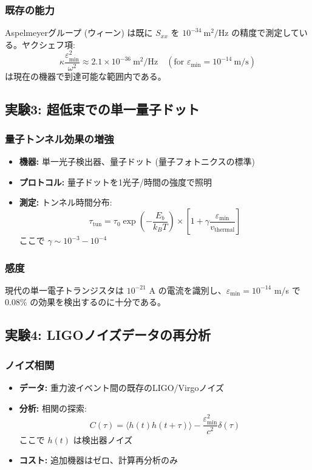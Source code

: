 \documentclass[11pt,a4paper]{article}
\begin{document}
	\subsubsection{既存の能力}
	
	Aspelmeyerグループ (ウィーン) は既に $S_{xx}$ を $10^{-34}\ \text{m}^2/\text{Hz}$ の精度で測定している。ヤクシェフ項:
	\[
	\kappa\frac{\varepsilon_{\min}^2}{\omega^2} \approx 2.1 \times 10^{-36}\ \text{m}^2/\text{Hz} \quad (\text{for } \varepsilon_{\min} = 10^{-14}\ \text{m/s})
	\]
	は現在の機器で到達可能な範囲内である。
	
	\subsection{実験3: 超低束での単一量子ドット}
	
	\subsubsection{量子トンネル効果の増強}
	\begin{itemize}
		\item \textbf{機器:} 単一光子検出器、量子ドット (量子フォトニクスの標準)
		\item \textbf{プロトコル:} 量子ドットを1光子/時間の強度で照明
		\item \textbf{測定:} トンネル時間分布:
		\[
		\tau_{\text{tun}} = \tau_0 \exp\left(-\frac{E_b}{k_B T}\right) \times \left[1 + \gamma\frac{\varepsilon_{\min}}{v_{\text{thermal}}}\right]
		\]
		ここで $\gamma \sim 10^{-3} - 10^{-4}$
	\end{itemize}
	
	\subsubsection{感度}
	
	現代の単一電子トランジスタは $10^{-21}$ A の電流を識別し、$\varepsilon_{\min} = 10^{-14}$ m/s で 0.08\% の効果を検出するのに十分である。
	
	\subsection{実験4: LIGOノイズデータの再分析}
	
	\subsubsection{ノイズ相関}
	\begin{itemize}
		\item \textbf{データ:} 重力波イベント間の既存のLIGO/Virgoノイズ
		\item \textbf{分析:} 相関の探索:
		\[
		C(\tau) = \langle h(t)h(t+\tau)\rangle - \frac{\varepsilon_{\min}^2}{c^2}\delta(\tau)
		\]
		ここで $h(t)$ は検出器ノイズ
		\item \textbf{コスト:} 追加機器はゼロ、計算再分析のみ
	\end{itemize}
	
\end{document}
